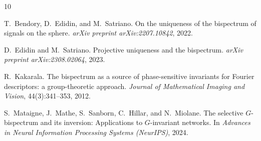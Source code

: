 \documentclass{article}
\theoremstyle{plain}
\theoremstyle{definition}
\theoremstyle{remark}
\begin{document}


\begin{thebibliography}{10}

T.~Bendory, D.~Edidin, and M.~Satriano.
\newblock On the uniqueness of the bispectrum of signals on the sphere.
\newblock \emph{arXiv preprint arXiv:2207.10842}, 2022.

D.~Edidin and M.~Satriano.
\newblock Projective uniqueness and the bispectrum.
\newblock \emph{arXiv preprint arXiv:2308.02064}, 2023.

R.~Kakarala.
\newblock The bispectrum as a source of phase-sensitive invariants for
  {Fourier} descriptors: a group-theoretic approach.
\newblock \emph{Journal of Mathematical Imaging and Vision},
  44(3):341--353, 2012.

S.~Mataigne, J.~Mathe, S.~Sanborn, C.~Hillar, and N.~Miolane.
\newblock The selective {$G$}-bispectrum and its inversion: Applications to
  {$G$}-invariant networks.
\newblock In \emph{Advances in Neural Information Processing Systems
  (NeurIPS)}, 2024.

\end{thebibliography}
\end{document}
